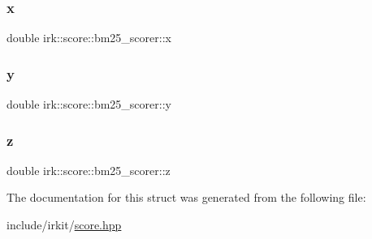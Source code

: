 \subsubsection{\texorpdfstring{x}{x}}
{\footnotesize\ttfamily double irk\+::score\+::bm25\+\_\+scorer\+::x}

\mbox{\label{structirk_1_1score_1_1bm25__scorer_a2a76be6700391b2b1309d03abd845975}} 
\subsubsection{\texorpdfstring{y}{y}}
{\footnotesize\ttfamily double irk\+::score\+::bm25\+\_\+scorer\+::y}

\mbox{\label{structirk_1_1score_1_1bm25__scorer_abb7948471b6e6e960b49d184f717f683}} 
\subsubsection{\texorpdfstring{z}{z}}
{\footnotesize\ttfamily double irk\+::score\+::bm25\+\_\+scorer\+::z}



The documentation for this struct was generated from the following file\+:\begin{DoxyCompactItemize}
\item 
include/irkit/\mbox{\hyperlink{score_8hpp}{score.\+hpp}}\end{DoxyCompactItemize}
